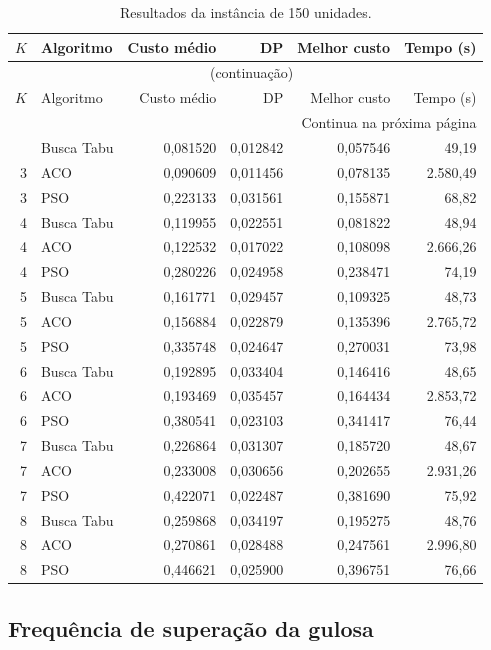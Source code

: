 \begingroup\small
\setlength{\tabcolsep}{5pt}
\begin{longtable}{rlrrrr}
\caption{Resultados da instância de 150 unidades.}\label{tab:resultados-150}\\
\toprule
$K$ & Algoritmo & Custo médio & DP & Melhor custo & Tempo (s) \\
\midrule
\endfirsthead
\multicolumn{6}{c}{\tablename~\thetable{} (continuação)}\\
\toprule
$K$ & Algoritmo & Custo médio & DP & Melhor custo & Tempo (s) \\
\midrule
\endhead
\midrule\multicolumn{6}{r}{Continua na próxima página}\\
\endfoot
\bottomrule
\endlastfoot
3 & Busca Tabu & 0,081520 & 0,012842 & 0,057546 & 49,19 \\
3 & ACO & 0,090609 & 0,011456 & 0,078135 & 2.580,49 \\
3 & PSO & 0,223133 & 0,031561 & 0,155871 & 68,82 \\
4 & Busca Tabu & 0,119955 & 0,022551 & 0,081822 & 48,94 \\
4 & ACO & 0,122532 & 0,017022 & 0,108098 & 2.666,26 \\
4 & PSO & 0,280226 & 0,024958 & 0,238471 & 74,19 \\
5 & Busca Tabu & 0,161771 & 0,029457 & 0,109325 & 48,73 \\
5 & ACO & 0,156884 & 0,022879 & 0,135396 & 2.765,72 \\
5 & PSO & 0,335748 & 0,024647 & 0,270031 & 73,98 \\
6 & Busca Tabu & 0,192895 & 0,033404 & 0,146416 & 48,65 \\
6 & ACO & 0,193469 & 0,035457 & 0,164434 & 2.853,72 \\
6 & PSO & 0,380541 & 0,023103 & 0,341417 & 76,44 \\
7 & Busca Tabu & 0,226864 & 0,031307 & 0,185720 & 48,67 \\
7 & ACO & 0,233008 & 0,030656 & 0,202655 & 2.931,26 \\
7 & PSO & 0,422071 & 0,022487 & 0,381690 & 75,92 \\
8 & Busca Tabu & 0,259868 & 0,034197 & 0,195275 & 48,76 \\
8 & ACO & 0,270861 & 0,028488 & 0,247561 & 2.996,80 \\
8 & PSO & 0,446621 & 0,025900 & 0,396751 & 76,66 \\
\end{longtable}
\endgroup

\subsection{Frequência de superação da gulosa}\label{ap:frequencias}

